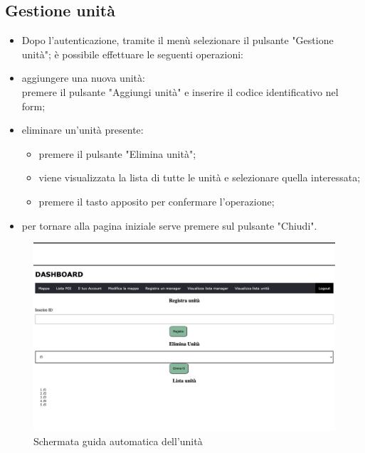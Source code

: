 \subsection{Gestione unità}
\begin{itemize}
\item Dopo l'autenticazione, tramite il menù selezionare il pulsante "Gestione unità"; è possibile effettuare le seguenti operazioni:
    \item aggiungere una nuova unità: \\premere il pulsante "Aggiungi unità" e inserire il codice identificativo nel form;
    \item eliminare un'unità presente: 
    \begin{itemize}
        \item premere il pulsante "Elimina unità";
        \item viene visualizzata la lista di tutte le unità e selezionare quella interessata;
        \item premere il tasto apposito per confermare l'operazione;
    \end{itemize}
    \item per tornare alla pagina iniziale serve premere sul pulsante "Chiudi".
\end{itemize}
\begin{figure}[H]
    \centering
    \includegraphics[scale=0.12]{res/images/newunit_admin.png}
    \caption{Schermata guida automatica dell'unità}
\end{figure}